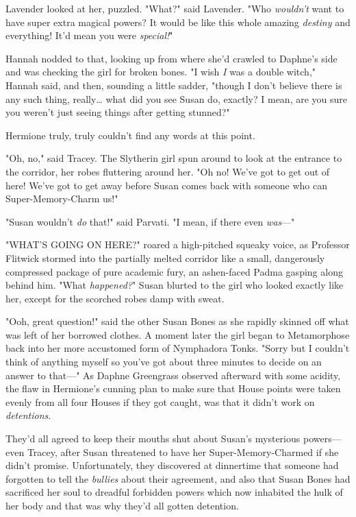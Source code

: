 Lavender looked at her, puzzled. "What?" said Lavender. "Who \emph{wouldn't} 
want to have super extra magical powers? It would be like this whole amazing 
\emph{destiny} and everything! It'd mean you were \emph{special!}"

Hannah nodded to that, looking up from where she'd crawled to Daphne's side and 
was checking the girl for broken bones. "I wish \emph{I} was a double witch," 
Hannah said, and then, sounding a little sadder, "though I don't believe there 
is any such thing, really{\ldots} what did you see Susan do, exactly? I mean, 
are you sure you weren't just seeing things after getting stunned?"

Hermione truly, truly couldn't find any words at this point.

"Oh, no," said Tracey. The Slytherin girl spun around to look at the entrance 
to the corridor, her robes fluttering around her. "Oh no! We've got to get out 
of here! We've got to get away before Susan comes back with someone who can 
Super-Memory-Charm us!"

"Susan wouldn't \emph{do} that!" said Parvati. "I mean, if there even 
\emph{was}---"

"WHAT'S GOING ON HERE?" roared a high-pitched squeaky voice, as Professor 
Flitwick stormed into the partially melted corridor like a small, dangerously 
compressed package of pure academic fury, an ashen-faced Padma gasping along 
behind him.
\sbreak
"What\emph{ happened?}" Susan blurted to the girl who looked exactly like her, 
except for the scorched robes damp with sweat.

"Ooh, great question!" said the other Susan Bones as she rapidly skinned off 
what was left of her borrowed clothes. A moment later the girl began to 
Metamorphose back into her more accustomed form of Nymphadora Tonks. "Sorry but 
I couldn't think of anything myself so you've got about three minutes to decide 
on an answer to that---"
\sbreak
As Daphne Greengrass observed afterward with some acidity, the flaw in 
Hermione's cunning plan to make sure that House points were taken evenly from 
all four Houses if they got caught, was that it didn't work on 
\emph{detentions}.

They'd all agreed to keep their mouths shut about Susan's mysterious 
powers---even Tracey, after Susan threatened to have her Super-Memory-Charmed 
if she didn't promise. Unfortunately, they discovered at dinnertime that 
someone had forgotten to tell the \emph{bullies} about their agreement, and 
also that Susan Bones had sacrificed her soul to dreadful forbidden powers 
which now inhabited the hulk of her body and that was why they'd all gotten 
detention.

